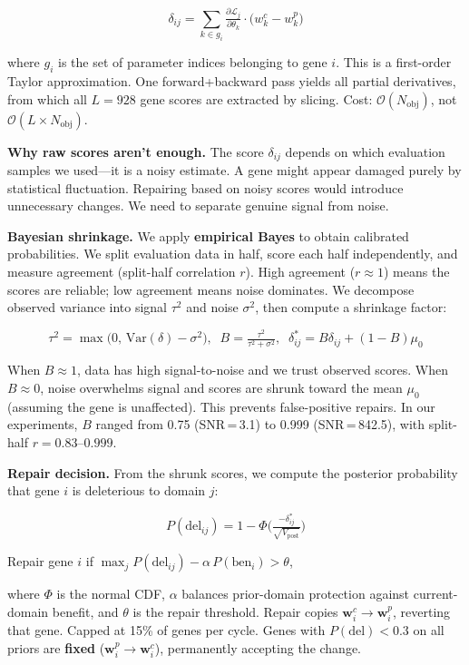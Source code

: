 \documentclass[9pt,letterpaper]{article}
\newcommand{\eqbox}[2]{%
  \vspace{0pt}\begin{center}\colorbox{tint}{\parbox{0.95\columnwidth}{\vspace{0pt}\begin{equation}\textstyle #1\tag{#2}\end{equation}\vspace{-4pt}}}\end{center}\vspace{-2pt}}
\begin{document}
\begin{multicols}{2}
\eqbox{\delta_{ij} = \!\sum_{k \in g_i}\! \tfrac{\partial \mathcal{L}_j}{\partial \theta_k} \!\cdot\! \bigl(w^c_k - w^p_k\bigr)}{1}

where $g_i$ is the set of parameter indices belonging to gene $i$. This is a first-order Taylor approximation. One forward+backward pass yields all partial derivatives, from which all $L\!=\!928$ gene scores are extracted by slicing. Cost: $\mathcal{O}(N_\text{obj})$, not $\mathcal{O}(L \!\times\! N_\text{obj})$.

\textbf{Why raw scores aren't enough.}
The score $\delta_{ij}$ depends on which evaluation samples we used---it is a noisy estimate. A gene might appear damaged purely by statistical fluctuation. Repairing based on noisy scores would introduce unnecessary changes. We need to separate genuine signal from noise.

\textbf{Bayesian shrinkage.}
We apply \textbf{empirical Bayes} to obtain calibrated probabilities. We split evaluation data in half, score each half independently, and measure agreement (split-half correlation $r$). High agreement ($r \approx 1$) means the scores are reliable; low agreement means noise dominates. We decompose observed variance into signal $\tau^2$ and noise $\sigma^2$, then compute a shrinkage factor:

\eqbox{\tau^2 = \max\!\bigl(0,\,\textrm{Var}(\delta) - \sigma^2\bigr),\;\; B = \tfrac{\tau^2}{\tau^2 + \sigma^2},\;\; \delta^*_{ij} = B\delta_{ij} + (1\!-\!B)\mu_0}{2}

When $B \approx 1$, data has high signal-to-noise and we trust observed scores. When $B \approx 0$, noise overwhelms signal and scores are shrunk toward the mean $\mu_0$ (assuming the gene is unaffected). This prevents false-positive repairs. In our experiments, $B$ ranged from 0.75 (SNR\,=\,3.1) to 0.999 (SNR\,=\,842.5), with split-half $r = 0.83$--$0.999$.

\textbf{Repair decision.}
From the shrunk scores, we compute the posterior probability that gene $i$ is deleterious to domain $j$:

\eqbox{P(\textrm{del}_{ij}) = 1 - \Phi\!\bigl(\tfrac{-\delta^*_{ij}}{\sqrt{V_\textrm{post}}}\bigr)}{3}

Repair gene $i$ if $\max_j P(\textrm{del}_{ij}) - \alpha\, P(\textrm{ben}_i) > \theta$,

where $\Phi$ is the normal CDF, $\alpha$ balances prior-domain protection against current-domain benefit, and $\theta$ is the repair threshold. Repair copies $\mathbf{w}^c_i \!\to\! \mathbf{w}^p_i$, reverting that gene. Capped at 15\% of genes per cycle. Genes with $P(\textrm{del}) < 0.3$ on all priors are \textbf{fixed} ($\mathbf{w}^p_i \!\to\! \mathbf{w}^c_i$), permanently accepting the change.


\end{multicols}
\end{document}
